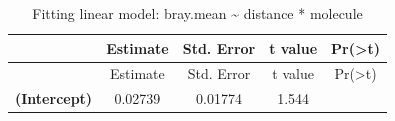 \documentclass[]{article}
\begin{document}
\begin{longtable}[]{@{}ccccc@{}}
\caption{Fitting linear model: bray.mean \textasciitilde{} distance *
molecule}\tabularnewline
\toprule
\begin{minipage}[b]{0.31\columnwidth}\centering\strut
~\strut
\end{minipage} & \begin{minipage}[b]{0.15\columnwidth}\centering\strut
Estimate\strut
\end{minipage} & \begin{minipage}[b]{0.15\columnwidth}\centering\strut
Std. Error\strut
\end{minipage} & \begin{minipage}[b]{0.13\columnwidth}\centering\strut
t value\strut
\end{minipage} & \begin{minipage}[b]{0.13\columnwidth}\centering\strut
Pr(\textgreater{}\textbar{}t\textbar{})\strut
\end{minipage}\tabularnewline
\midrule
\endfirsthead
\toprule
\begin{minipage}[b]{0.31\columnwidth}\centering\strut
~\strut
\end{minipage} & \begin{minipage}[b]{0.15\columnwidth}\centering\strut
Estimate\strut
\end{minipage} & \begin{minipage}[b]{0.15\columnwidth}\centering\strut
Std. Error\strut
\end{minipage} & \begin{minipage}[b]{0.13\columnwidth}\centering\strut
t value\strut
\end{minipage} & \begin{minipage}[b]{0.13\columnwidth}\centering\strut
Pr(\textgreater{}\textbar{}t\textbar{})\strut
\end{minipage}\tabularnewline
\midrule
\endhead
\begin{minipage}[t]{0.31\columnwidth}\centering\strut
\textbf{(Intercept)}\strut
\end{minipage} & \begin{minipage}[t]{0.15\columnwidth}\centering\strut
0.02739\strut
\end{minipage} & \begin{minipage}[t]{0.15\columnwidth}\centering\strut
0.01774\strut
\end{minipage} & \begin{minipage}[t]{0.13\columnwidth}\centering\strut
1.544\strut
\end{minipage} & \begin{minipage}[t]{0.13\columnwidth}\centering\strut

\end{minipage}
\end{longtable}
\end{document}
